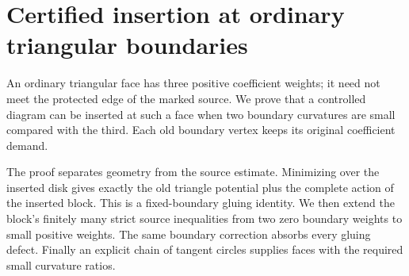 \chapter{Certified insertion at ordinary triangular boundaries}
\label{app:triangular-boundary-insertion}

An ordinary triangular face has three positive coefficient weights; it
need not meet the protected edge of the marked source. We prove that a
controlled diagram can be inserted at such a face when two boundary
curvatures are small compared with the third. Each old boundary vertex
keeps its original coefficient demand.

The proof separates geometry from the source estimate. Minimizing over
the inserted disk gives exactly the old triangle potential plus the
complete action of the inserted block. This is a fixed-boundary gluing
identity. We then extend the block's finitely many strict source
inequalities from two zero boundary weights to small positive weights.
The same boundary correction absorbs every gluing defect. Finally an
explicit chain of tangent circles supplies faces with the required
small curvature ratios.

